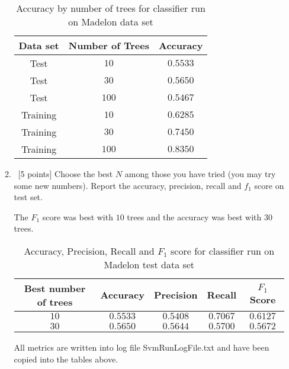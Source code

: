 \begin{enumerate}
\begin{enumerate}
      \begin{table}[H]
    \centering
    \begin{tabular}{| c | c | c |}
      \hline
      Data set & Number of Trees & Accuracy \\
      \hline
      Test& $10$ & $0.5533$\\
      \hline
      Test& $30$ & $0.5650$\\
      \hline
      Test& $100$ & $0.5467$\\
      \hline
      Training& $10$ & $0.6285$\\
      \hline
      Training& $30$ & $0.7450$\\
      \hline
      Training& $100$ & $0.8350$\\
      \hline
   \end{tabular}
    \caption{Accuracy by number of trees for classifier run on Madelon data set}
  \end{table}   


  \item ~[5 points] Choose the best $N$ among those you have tried
    (you may try some new numbers). Report the accuracy, precision,
    recall and $f_1$ score on test set.
    
    The $F_1$ score was best with $10$ trees and the accuracy was best with $30$ trees.
          \begin{table}[H]
    \centering
    \begin{tabular}{| c | c | c | c | c |}
      \hline
      Best number of trees & Accuracy &Precision & Recall & $F_1$ Score  \\
      \hline
      $10$ & $0.5533$ & $0.5408$& $0.7067$& $0.6127$\\
      \hline
      $30$ & $0.5650$ & $0.5644$& $0.5700$& $0.5672$\\
      \hline
    \end{tabular}
    \caption{Accuracy, Precision, Recall and $F_1$ score for classifier run on Madelon test data set}
  \end{table}   
    
All metrics are written into log file SvmRunLogFile.txt and have been copied into the tables above.

  \end{enumerate}
\end{enumerate}

